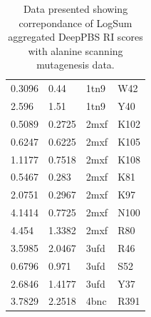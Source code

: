 \begin{table}[]
\begin{tabular}{|l|l|l|l|}
0.3096 & 0.44 & 1tn9 & W42 \\
2.596 & 1.51 & 1tn9 & Y40 \\
0.5089 & 0.2725 & 2mxf & K102 \\
0.6247 & 0.6225 & 2mxf & K105 \\
1.1177 & 0.7518 & 2mxf & K108 \\
0.5467 & 0.283 & 2mxf & K81 \\
2.0751 & 0.2967 & 2mxf & K97 \\
4.1414 & 0.7725 & 2mxf & N100 \\
4.454 & 1.3382 & 2mxf & R80 \\
3.5985 & 2.0467 & 3ufd & R46 \\
0.6796 & 0.971 & 3ufd & S52 \\
2.6846 & 1.4177 & 3ufd & Y37 \\
3.7829 & 2.2518 & 4bnc & R391\\
\hline
\end{tabular}%
\caption[Data presented showing correpondance of LogSum aggregated DeepPBS RI scores with alanine scanning mutagenesis data.]{Data presented showing correpondance of LogSum aggregated DeepPBS RI scores with alanine scanning mutagenesis data.}
\label{table:pdna1}
\end{table}
